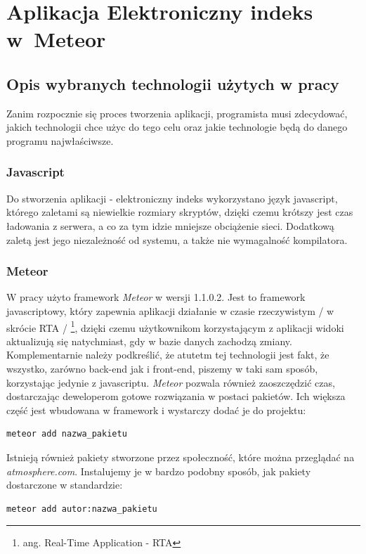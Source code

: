 \documentclass{xmgr}
\begin{document}
\chapter{Aplikacja Elektroniczny indeks w~Meteor}
\section{Opis wybranych technologii użytych w pracy}
\indent \indent \indent Zanim rozpocznie się proces tworzenia aplikacji, programista musi zdecydować, jakich technologii chce użyc do tego celu oraz jakie technologie będą do danego programu najwłaściwsze.
\subsection{Javascript}
\indent \indent \indent Do stworzenia aplikacji - elektroniczny indeks wykorzystano język javascript, którego zaletami są niewielkie rozmiary skryptów, dzięki czemu krótszy jest czas ładowania z serwera, a co za tym idzie mniejsze obciążenie sieci. Dodatkową zaletą jest jego niezależność od systemu, a także nie wymagalność kompilatora.
\subsection{Meteor}
\indent \indent \indent W pracy użyto framework \textit{Meteor} w wersji 1.1.0.2. Jest to framework javascriptowy, który zapewnia aplikacji działanie w czasie rzeczywistym / w skrócie RTA / \footnote{ang. Real-Time Application - RTA}, dzięki czemu użytkownikom korzystającym z aplikacji widoki aktualizują się natychmiast, gdy w bazie danych zachodzą zmiany. Komplementarnie należy podkreślić, że atutetm tej technologii jest fakt, że wszystko, zarówno back-end jak i front-end, piszemy w taki sam sposób, korzystając jedynie z javascriptu. \textit{Meteor} pozwala również zaoszczędzić czas, dostarczając deweloperom gotowe rozwiązania w postaci pakietów. Ich większa część jest wbudowana w framework i wystarczy dodać je do projektu:
\begin{lstlisting}[language=bash,caption={Dodanie standardowego pakietu do projektu}]
	meteor add nazwa_pakietu
\end{lstlisting}
Istnieją również pakiety stworzone przez społeczność, które można przeglądać na \textit{atmosphere.com}. Instalujemy je w bardzo podobny sposób, jak pakiety dostarczone w standardzie:
\begin{lstlisting}[language=bash,caption={Dodanie zewnętrznego pakietu do projektu}]
	meteor add autor:nazwa_pakietu
\end{lstlisting}
\end{document}
